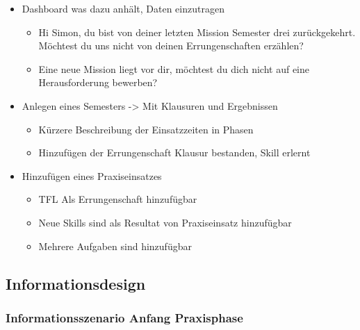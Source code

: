 \documentclass[
  12pt,
  ngerman,
  a4paper,
]{article}
\providecommand{\tightlist}{%
  \setlength{\itemsep}{0pt}\setlength{\parskip}{0pt}}
\begin{document}
\begin{itemize}
\tightlist
\item
  Dashboard was dazu anhält, Daten einzutragen

  \begin{itemize}
  \tightlist
  \item
    Hi Simon, du bist von deiner letzten Mission Semester drei
    zurückgekehrt. Möchtest du uns nicht von deinen Errungenschaften
    erzählen?
  \item
    Eine neue Mission liegt vor dir, möchtest du dich nicht auf eine
    Herausforderung bewerben?
  \end{itemize}
\item
  Anlegen eines Semesters -\textgreater{} Mit Klausuren und Ergebnissen

  \begin{itemize}
  \tightlist
  \item
    Kürzere Beschreibung der Einsatzzeiten in Phasen
  \item
    Hinzufügen der Errungenschaft Klausur bestanden, Skill erlernt
  \end{itemize}
\item
  Hinzufügen eines Praxiseinsatzes

  \begin{itemize}
  \tightlist
  \item
    TFL Als Errungenschaft hinzufügbar
  \item
    Neue Skills sind als Resultat von Praxiseinsatz hinzufügbar
  \item
    Mehrere Aufgaben sind hinzufügbar
  \end{itemize}
\end{itemize}

\hypertarget{informationsdesign}{%
\subsection{Informationsdesign}\label{informationsdesign}}

\hypertarget{informationsszenario-anfang-praxisphase}{%
\subsubsection{Informationsszenario Anfang
Praxisphase}\label{informationsszenario-anfang-praxisphase}}
\end{document}

